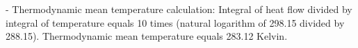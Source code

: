 - Thermodynamic mean temperature calculation:  
  Integral of heat flow divided by integral of temperature equals 10 times (natural logarithm of 298.15 divided by 288.15).  
  Thermodynamic mean temperature equals 283.12 Kelvin.